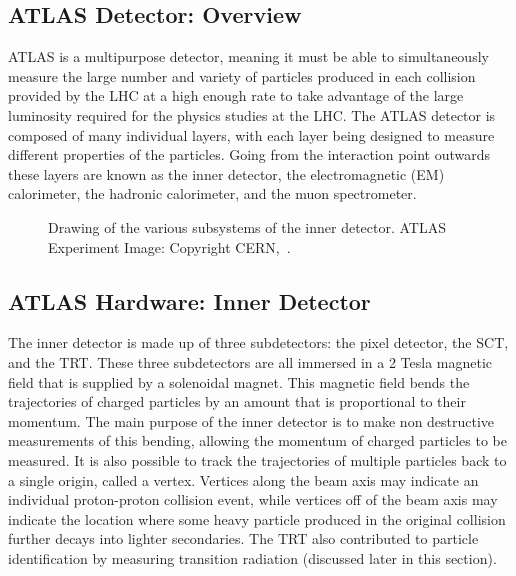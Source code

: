 \subsection{ATLAS Detector: Overview}

ATLAS is a multipurpose detector, meaning it must be able to simultaneously measure the large number and variety of particles produced in each collision provided by the LHC at a high enough rate to take advantage of the large luminosity required for the physics studies at the LHC. 
The ATLAS detector is composed of many individual layers, with each layer being designed to measure different properties of the particles.  
Going from the interaction point outwards these layers are known as the inner detector, the electromagnetic (EM) calorimeter, the hadronic calorimeter, and the muon spectrometer.   

\begin{figure}[!ht]
  \begin{center}
  \end{center}
  \caption[Layout of the ATLAS Inner Detector]
  {\small Drawing of the various subsystems of the inner detector.  ATLAS Experiment Image: Copyright CERN,~\cite{Pequenao:1095926}.}
\end{figure}

\subsection{ATLAS Hardware: Inner Detector}
\label{Sec.ID}
The inner detector is made up of three subdetectors: the pixel detector, the \gls{SCT}, and the \gls{TRT}.  
These three subdetectors are all immersed in a 2 Tesla magnetic field that is supplied by a solenoidal magnet.  
This magnetic field bends the trajectories of charged particles by an amount that is proportional to their momentum.  
The main purpose of the inner detector is to make non destructive measurements of this bending, allowing the momentum of charged particles to be measured.  
It is also possible to track the trajectories of multiple particles back to a single origin, called a vertex.  
Vertices along the beam axis may indicate an individual proton-proton collision event, while vertices off of the beam axis may indicate the location where some heavy particle produced in the original collision further decays into lighter secondaries.  
The \gls{TRT} also contributed to particle identification by measuring transition radiation (discussed later in this section).  
 
